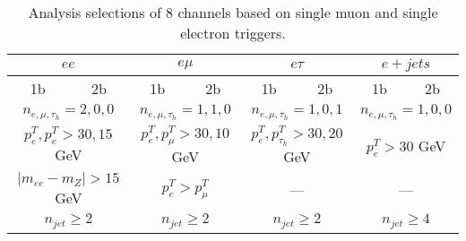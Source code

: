 \begin{table}[ht]
\begin{tabular}{|cc|cc|cc|cc|}
    \hline
    \multicolumn{2}{|c|}{$e e$} 					& \multicolumn{2}{c|}{$e \mu$} 				      & \multicolumn{2}{c|}{$e \tau$} 			     		& \multicolumn{2}{c|}{$e + jets$} 			     	\\
    \hline
    1b & 2b                   						& 1b & 2b        	 						      & 1b & 2b        										& 1b & 2b         			        				\\
    \hline 
    \multicolumn{2}{|c|}{$n_{e,\mu,\tau_h} = 2,0,0$}& \multicolumn{2}{c|}{$n_{e,\mu,\tau_h} = 1,1,0$} & \multicolumn{2}{c|}{$n_{e,\mu,\tau_h} = 1,0,1$}      & \multicolumn{2}{c|}{$n_{e,\mu,\tau_h} = 1,0,0$} 	\\
    \multicolumn{2}{|c|}{$p^T_e,p^T_e>30,15$ GeV}   & \multicolumn{2}{c|}{$p^T_e,p^T_\mu>30,10$ GeV}  & \multicolumn{2}{c|}{$p^T_e,p^T_{\tau_h}>30,20$ GeV}  & \multicolumn{2}{c|}{$p^T_e>30$ GeV}           	\\
    \multicolumn{2}{|c|}{$|m_{ee}-m_Z|>15$ GeV }    & \multicolumn{2}{c|}{$p^T_e>p^T_\mu$}   		  & \multicolumn{2}{c|}{ --- }						     & \multicolumn{2}{c|}{ --- } 						\\
    \multicolumn{2}{|c|}{$n_{jet}\geq2$}			& \multicolumn{2}{c|}{$n_{jet}\geq2$}             & \multicolumn{2}{c|}{$n_{jet}\geq2$} 				 & \multicolumn{2}{c|}{$n_{jet}\geq4$}             	\\
    \hline
    
    \end{tabular}
    
    \caption{Analysis selections of 8 channels based on single muon and single electron triggers.}
    \label{tab:analysis:selection:eventSelection}
\end{table}